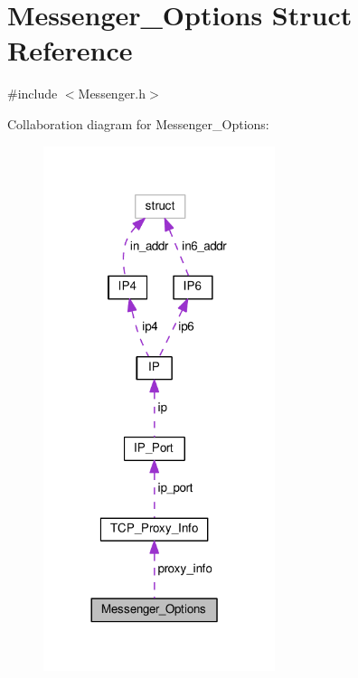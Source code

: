 \hypertarget{struct_messenger___options}{\section{Messenger\+\_\+\+Options Struct Reference}
\label{struct_messenger___options}
}


{\ttfamily \#include $<$Messenger.\+h$>$}



Collaboration diagram for Messenger\+\_\+\+Options\+:
\nopagebreak
\begin{figure}[H]
\begin{center}
\leavevmode
\includegraphics[width=192pt]{d8/d5e/struct_messenger___options__coll__graph}
\end{center}
\end{figure}
